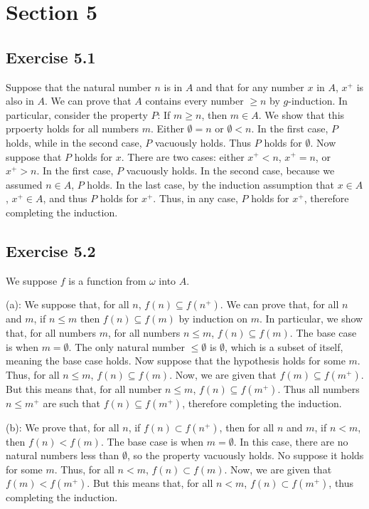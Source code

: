 \documentclass{article}
\theoremstyle{definition}
\begin{document}
\section*{Section 5}

\subsection*{Exercise 5.1}
Suppose that the natural number $n$ is in $A$ and that for any number $x$ in $A$, $x^+$ is also in $A$. We can prove that $A$ contains every number $\ge n$ by $g$-induction. In particular, 
consider the property $P$: If $m\ge n$, then $m\in A$. We show that this prpoerty holds for all numbers $m$. Either $\emptyset=n$ or $\emptyset <n$. In the first case, $P$ holds, while 
in the second case, $P$ vacuously holds. Thus $P$ holds for $\emptyset$. Now suppose that $P$ holds for $x$. There are two cases: either $x^+<n$, $x^+=n$, or $x^+>n$. In the first case, $P$ 
vacuously holds. In the second case, because we assumed $n\in A$, $P$ holds. In the last case, by the induction assumption that $x\in A$, $x^+\in A$, and thus $P$ holds for 
$x^+$. Thus, in any case, $P$ holds for $x^+$, therefore completing the induction.

\subsection*{Exercise 5.2}
We suppose $f$ is a function from $\omega$ into $A$.


(a): We suppose that, for all $n$, $f(n)\subseteq f(n^+)$. We can prove that, for all $n$ and $m$, if $n\le m$ then $f(n)\subseteq f(m)$ by induction on $m$. In particular, we show that, for 
all numbers $m$, for all numbers $n\le m$, $f(n)\subseteq f(m)$. The base case is when $m=\emptyset$. The only natural number $\le\emptyset$ is $\emptyset$, which is a subset of itself, meaning 
the base case holds. Now suppose that the hypothesis holds for some $m$. Thus, for all $n\le m$, $f(n)\subseteq f(m)$. Now, we are given that $f(m)\subseteq f(m^+)$. But this means that, 
for all number $n\le m$, $f(n)\subseteq f(m^+)$. Thus all numbers $n\le m^+$ are such that $f(n)\subseteq f(m^+)$, therefore completing the induction.


(b): We prove that, for all $n$, if $f(n)\subset f(n^+)$, then for all $n$ and $m$, if $n<m$, then $f(n)<f(m)$. The base case is when $m=\emptyset$. In this case, there 
are no natural numbers less than $\emptyset$, so the property vacuously holds. No suppose it holds for some $m$. Thus, for all $n<m$, $f(n)\subset f(m)$. Now, we are given that $f(m)<f(m^+)$. 
But this means that, for all $n<m$, $f(n)\subset f(m^+)$, thus completing the induction.
\end{document}
